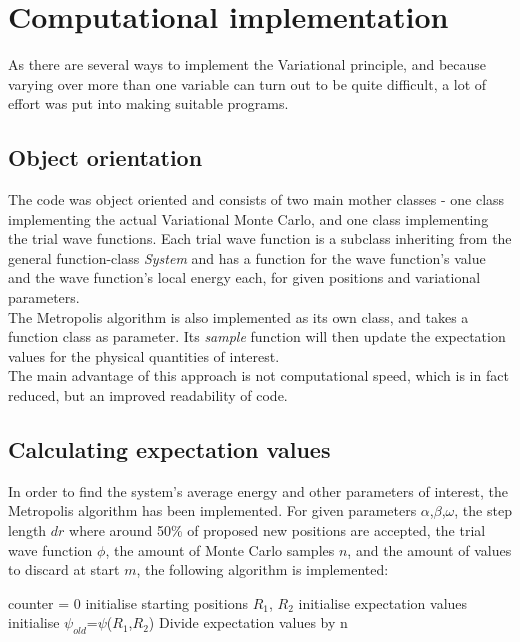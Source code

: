 \documentclass[10pt,a4paper]{article}
\begin{document}
\section{Computational implementation}
As there are several ways to implement the Variational principle, and because varying over more than one variable can turn out to be quite difficult, a lot of effort was put into making suitable programs.
\subsection{Object orientation}
The code was object oriented and consists of two main mother classes - one class implementing the actual Variational Monte Carlo, and one class implementing the trial wave functions. Each trial wave function  is a subclass inheriting from the general function-class \textit{System} and has a function for the wave function's value and the wave function's local energy each, for given positions and variational parameters.\\
The Metropolis algorithm is also implemented as its own class, and takes a function class as parameter. Its \textit{sample} function will then update the expectation values for the physical quantities of interest. \\
The main advantage of this approach is not computational speed, which is in fact reduced, but an improved readability of code.
\subsection{Calculating expectation values}
In order to find the system's average energy and other parameters of interest, the Metropolis algorithm has been implemented. 
For given parameters $\alpha$,$\beta$,$\omega$, the step length $dr$ where around 50\% of proposed new positions are accepted, the trial wave function $\phi$, the amount of Monte Carlo samples $n$, and the amount of values to discard at start $m$, the following algorithm is implemented:\\
\IncMargin{1em}
\begin{algorithm}[H]
counter = 0\;
initialise starting positions $R_1$, $R_2$\;
initialise expectation values\;
initialise $\psi_{old}$=$\psi$($R_1$,$R_2$)\;
Divide expectation values by n\; 
\end{algorithm}
\DecMargin{1em}
\end{document}
